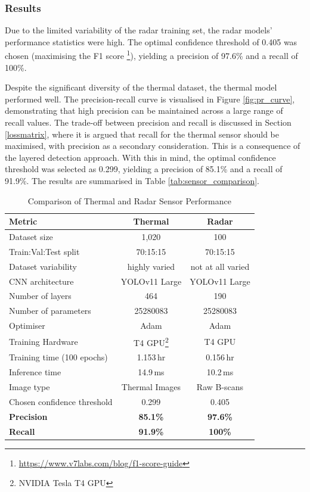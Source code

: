\subsubsection{Results} 

Due to the limited variability of the radar training set, the radar models' performance statistics were high. The optimal confidence threshold of 0.405 was chosen (maximising the F1 score \footnote{\url{https://www.v7labs.com/blog/f1-score-guide}}), yielding a precision of 97.6\% and a recall of 100\%.

Despite the significant diversity of the thermal dataset, the thermal model performed well. The precision-recall curve is visualised in Figure \ref{fig:pr_curve}, demonstrating that high precision can be maintained across a large range of recall values. The trade-off between precision and recall is discussed in Section \ref{lossmatrix}, where it is argued that recall for the thermal sensor should be maximised, with precision as a secondary consideration. This is a consequence of the layered detection approach. With this in mind, the optimal confidence threshold was selected as 0.299, yielding a precision of 85.1\% and a recall of 91.9\%. The results are summarised in Table \ref{tab:sensor_comparison}.

\begin{table}[htbp]
\centering
\caption{Comparison of Thermal and Radar Sensor Performance}
\label{tab:sensor_comparison}
\begin{tabular}{lcc}
\hline
\textbf{Metric} & \textbf{Thermal} & \textbf{Radar} \\ 
\hline
Dataset size & 1,020 & 100 \\
Train:Val:Test split & 70:15:15 & 70:15:15 \\
Dataset variability & highly varied & not at all varied \\
CNN architecture & YOLOv11 Large & YOLOv11 Large \\
Number of layers & 464 & 190 \\
Number of parameters & 25280083 & 25280083 \\
Optimiser & Adam & Adam \\
Training Hardware & T4 GPU\footnote{\label{ftn:t4gpu}NVIDIA Tesla T4 GPU} & T4 GPU\\
Training time (100 epochs) & 1.153\,hr & 0.156\,hr \\
Inference time & 14.9\,ms & 10.2\,ms \\
Image type & Thermal Images & Raw B-scans \\
Chosen confidence threshold & 0.299 & 0.405 \\
\hline
\rowcolor{gray!10} \textbf{Precision} & \textbf{85.1\%} & \textbf{97.6\%} \\
\rowcolor{gray!10} \textbf{Recall} & \textbf{91.9\%} & \textbf{100\%} \\
\hline
\end{tabular}
\end{table}


